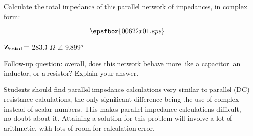 

Calculate the total impedance of this parallel network of impedances, in complex form:

$$\epsfbox{00622x01.eps}$$







${\bf Z_{total}} =$ 283.3 $\Omega$ $\angle$ 9.899$^{o}$

\vskip 10pt

Follow-up question: overall, does this network behave more like a capacitor, an inductor, or a resistor?  Explain your answer.







Students should find parallel impedance calculations very similar to parallel (DC) resistance calculations, the only significant difference being the use of complex instead of scalar numbers.  This makes parallel impedance calculations difficult, no doubt about it.  Attaining a solution for this problem will involve a lot of arithmetic, with lots of room for calculation error.





